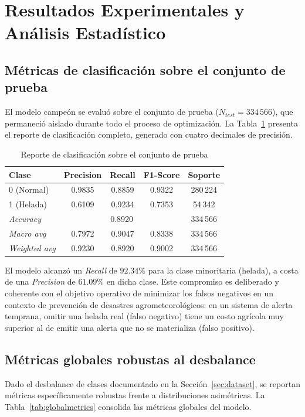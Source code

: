 \section{Resultados Experimentales y Análisis Estadístico}\label{sec:results}

\subsection{Métricas de clasificación sobre el conjunto de prueba}
El modelo campeón se evaluó sobre el conjunto de prueba
($N_{test}=334\,566$), que permaneció aislado durante todo el proceso de
optimización. La Tabla~\ref{tab:classreport} presenta el reporte de clasificación
completo, generado con cuatro decimales de precisión.

\begin{table}[H]
\centering
\caption{Reporte de clasificación sobre el conjunto de prueba}
\label{tab:classreport}
\footnotesize
\begin{tabular}{lcccc}
\toprule
\textbf{Clase} & \textbf{Precision} & \textbf{Recall} & \textbf{F1-Score} & \textbf{Soporte} \\
\midrule
0 (Normal) & 0.9835 & 0.8859 & 0.9322 & 280\,224 \\
1 (Helada) & 0.6109 & 0.9234 & 0.7353 & 54\,342 \\
\midrule
\textit{Accuracy} & \multicolumn{3}{c}{0.8920} & 334\,566 \\
\textit{Macro avg} & 0.7972 & 0.9047 & 0.8338 & 334\,566 \\
\textit{Weighted avg} & 0.9230 & 0.8920 & 0.9002 & 334\,566 \\
\bottomrule
\end{tabular}
\end{table}

El modelo alcanzó un \emph{Recall} de $92.34\%$ para la clase minoritaria
(helada), a costa de una \emph{Precision} de $61.09\%$ en dicha clase. Este
compromiso es deliberado y coherente con el objetivo operativo de minimizar los
falsos negativos en un contexto de prevención de desastres agrometeorológicos:
en un sistema de alerta temprana, omitir una helada real (falso negativo) tiene un
costo agrícola muy superior al de emitir una alerta que no se materializa (falso
positivo).

\subsection{Métricas globales robustas al desbalance}
Dado el desbalance de clases documentado en la Sección~\ref{sec:dataset}, se
reportan métricas específicamente robustas frente a distribuciones asimétricas.
La Tabla~\ref{tab:globalmetrics} consolida las métricas globales del modelo.

